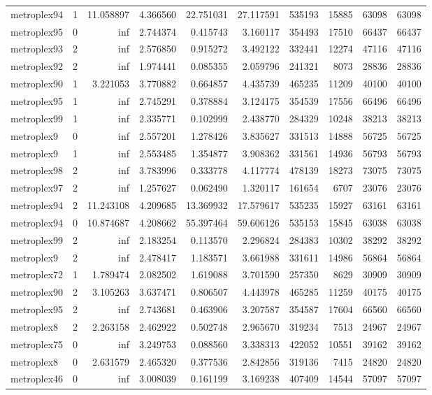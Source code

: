 \documentclass[../../../thesis.tex]{subfiles}
\begin{document}
\begin{longtable}{|l|r|r|r|r|r|r|r|r|r|}
metroplex94 & 1 & 11.058897 & 4.366560 & 22.751031 & 27.117591 & 535193 & 15885 & 63098 & 63098 \\
metroplex95 & 0 & inf & 2.744374 & 0.415743 & 3.160117 & 354493 & 17510 & 66437 & 66437 \\
metroplex93 & 2 & inf & 2.576850 & 0.915272 & 3.492122 & 332441 & 12274 & 47116 & 47116 \\
metroplex92 & 2 & inf & 1.974441 & 0.085355 & 2.059796 & 241321 & 8073 & 28836 & 28836 \\
metroplex90 & 1 & 3.221053 & 3.770882 & 0.664857 & 4.435739 & 465235 & 11209 & 40100 & 40100 \\
metroplex95 & 1 & inf & 2.745291 & 0.378884 & 3.124175 & 354539 & 17556 & 66496 & 66496 \\
metroplex99 & 1 & inf & 2.335771 & 0.102999 & 2.438770 & 284329 & 10248 & 38213 & 38213 \\
metroplex9 & 0 & inf & 2.557201 & 1.278426 & 3.835627 & 331513 & 14888 & 56725 & 56725 \\
metroplex9 & 1 & inf & 2.553485 & 1.354877 & 3.908362 & 331561 & 14936 & 56793 & 56793 \\
metroplex98 & 2 & inf & 3.783996 & 0.333778 & 4.117774 & 478139 & 18273 & 73075 & 73075 \\
metroplex97 & 2 & inf & 1.257627 & 0.062490 & 1.320117 & 161654 & 6707 & 23076 & 23076 \\
metroplex94 & 2 & 11.243108 & 4.209685 & 13.369932 & 17.579617 & 535235 & 15927 & 63161 & 63161 \\
metroplex94 & 0 & 10.874687 & 4.208662 & 55.397464 & 59.606126 & 535153 & 15845 & 63038 & 63038 \\
metroplex99 & 2 & inf & 2.183254 & 0.113570 & 2.296824 & 284383 & 10302 & 38292 & 38292 \\
metroplex9 & 2 & inf & 2.478417 & 1.183571 & 3.661988 & 331611 & 14986 & 56864 & 56864 \\
metroplex72 & 1 & 1.789474 & 2.082502 & 1.619088 & 3.701590 & 257350 & 8629 & 30909 & 30909 \\
metroplex90 & 2 & 3.105263 & 3.637471 & 0.806507 & 4.443978 & 465285 & 11259 & 40175 & 40175 \\
metroplex95 & 2 & inf & 2.743681 & 0.463906 & 3.207587 & 354587 & 17604 & 66560 & 66560 \\
metroplex8 & 2 & 2.263158 & 2.462922 & 0.502748 & 2.965670 & 319234 & 7513 & 24967 & 24967 \\
metroplex75 & 0 & inf & 3.249753 & 0.088560 & 3.338313 & 422052 & 10551 & 39162 & 39162 \\
metroplex8 & 0 & 2.631579 & 2.465320 & 0.377536 & 2.842856 & 319136 & 7415 & 24820 & 24820 \\
metroplex46 & 0 & inf & 3.008039 & 0.161199 & 3.169238 & 407409 & 14544 & 57097 & 57097 \\
\end{longtable}
\end{document}

